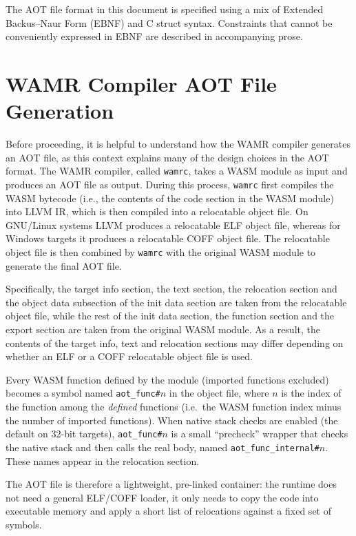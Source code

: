 \documentclass{article}
\begin{document}
The AOT file format in this document is specified using a mix of Extended Backus–Naur Form (EBNF) \cite{wikipedia-ebnf} and C struct syntax.
Constraints that cannot be conveniently expressed in EBNF are described in accompanying prose.

\section{WAMR Compiler AOT File Generation}
\label{subsec:how-wasmc-generates-aot}

Before proceeding, it is helpful to understand how the WAMR compiler generates an AOT file, as this context explains many of the design choices in the AOT format.
The WAMR compiler, called \verb|wamrc|, takes a WASM module as input and produces an AOT file as output.
During this process, \verb|wamrc| first compiles the WASM bytecode (i.e., the contents of the code section in the WASM module) into LLVM IR, which is then compiled into a relocatable object file.
On GNU/Linux systems LLVM produces a relocatable ELF object file, whereas for Windows targets it produces a relocatable COFF object file.
The relocatable object file is then combined by \verb|wamrc| with the original WASM module to generate the final AOT file.

Specifically, the target info section, the text section, the relocation section and the object data subsection of the init data section are taken from the relocatable object file, while the rest of the init data section, the function section and the export section are taken from the original WASM module.
As a result, the contents of the target info, text and relocation sections may differ depending on whether an ELF or a COFF relocatable object file is used.

Every WASM function defined by the module (imported functions excluded) becomes a symbol named \texttt{aot\_func\#$n$} in the object file, where $n$ is the index of the function among the \emph{defined} functions (i.e.\ the WASM function index minus the number of imported functions).
When native stack checks are enabled (the default on 32-bit targets), \texttt{aot\_func\#$n$} is a small ``precheck'' wrapper that checks the native stack and then calls the real body, named \texttt{aot\_func\_internal\#$n$}.
These names appear in the relocation section.

The AOT file is therefore a lightweight, pre-linked container: the runtime does not need a general ELF/COFF loader, it only needs to copy the code into executable memory and apply a short list of relocations against a fixed set of symbols.
\end{document}
